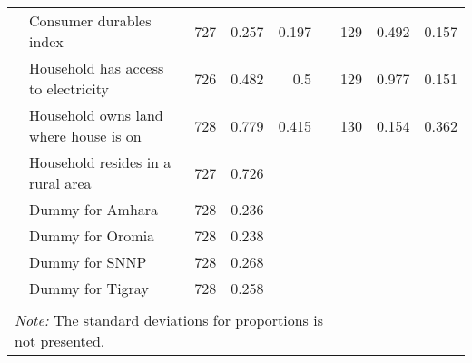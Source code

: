 \begin{table}[ht]
\begin{tabular}{llrrrlrrr}
   & Consumer durables index &   727 & 0.257 & 0.197 &  &   129 & 0.492 & 0.157 \\ 
   & Household has access to electricity &   726 & 0.482 &   0.5 &  &   129 & 0.977 & 0.151 \\ 
   & Household owns land where house is on &   728 & 0.779 & 0.415 &  &   130 & 0.154 & 0.362 \\ 
   & Household resides in a rural area &   727 & 0.726 &  &  &  &  &  \\ 
   & Dummy for Amhara &   728 & 0.236 &  &  &  &  &  \\ 
   & Dummy for Oromia &   728 & 0.238 &  &  &  &  &  \\ 
   & Dummy for SNNP &   728 & 0.268 &  &  &  &  &  \\ 
   & Dummy for Tigray &   728 & 0.258 &  &  &  &  &  \\ 
    \bottomrule   
 \\[-1.8ex] \multicolumn{6}{l}{\footnotesize{\textit{Note:} The standard deviations for proportions is 
               not presented.}} 
\end{tabular}
\end{table}
